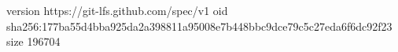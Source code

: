 version https://git-lfs.github.com/spec/v1
oid sha256:177ba55d4bba925da2a398811a95008e7b448bbc9dce79c5c27eda6f6dc92f23
size 196704
